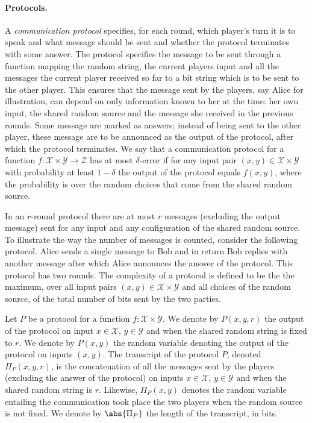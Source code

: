 \paragraph{Protocols.}
A {\em communication protocol} specifies, for each round, which
player's turn it is to speak and what message should be sent and
whether the protocol terminates with some answer. The protocol
specifies the message to be sent through a function mapping the
random string, the current players input and all the messages
the current player received so far to a bit string which is to be
sent to the other player. This ensures that the message sent by
the players, say Alice for illustration, 
can depend on only information known to her at the
time: her own input, the shared random source and the message
she received in the previous rounds.
Some message are marked as answers; instead of being sent to the
other player, these message are to be announced as the output of
the protocol, after which the protocol terminates. We say that a
communication protocol for a function
$f\colon\mathcal{X}\times\mathcal{Y}\to\mathcal{Z}$ has at most $\delta$-error
if for any input pair $(x,y)\in\mathcal{X}\times\mathcal{Y}$
with probability at least $1-\delta$ the output of the protocol
equals $f(x,y)$, where the probability is over the random
choices that come from the shared random source.

In an $r$-round protocol there are at most $r$ messages
(excluding the output message) sent for any input and any
configuration of the shared random source. 
To illustrate the way the number of messages is counted, consider 
the following protocol. Alice sends a single message to Bob and 
in return Bob replies with another message after which Alice
announces the answer of the protocol. This protocol has two rounds.
The complexity of a protocol is defined to be the the maximum, over all input pairs
$(x,y)\in\mathcal{X}\times\mathcal{Y}$ and all choices of the
random source, of the total number of bits sent by the two
parties.

Let $P$ be a protocol for a function 
$f\colon\mathcal{X}\times\mathcal{Y}$. We denote by $P(x,y,r)$
the output of the protocol on input $x\in\mathcal{X}$, $y\in\mathcal{Y}$
and when the shared random string is fixed to $r$. We denote by $P(x,y)$ the random
variable denoting the output of the protocol on inputs $(x,y)$.
The transcript of the protocol $P$, denoted $\Pi_P(x,y,r)$, 
is the concatenation of all the messages sent by the players 
(excluding the answer of the protocol) on inputs
$x\in\mathcal{X}$, $y\in\mathcal{Y}$ and when the shared random string is $r$.
Likewise, $\Pi_P(x,y)$ denotes the random variable entailing the communication
took place the two players when the random source is not fixed. 
We denote by $\abs{\Pi_P}$ the length of the transcript, in bits.

